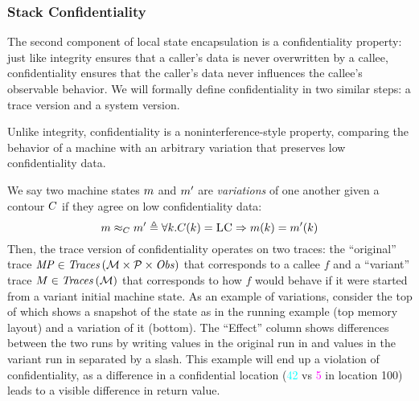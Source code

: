 \documentclass[acmsmall,review,anonymous]{acmart}\settopmatter{printfolios=true,printccs=false,printacmref=false}
\begin{document}
{%
%

\subsubsection{Stack Confidentiality}

The second component of local state encapsulation is a confidentiality
property: just like integrity ensures that a caller's data is never
overwritten by a callee, confidentiality ensures that the caller's data never
influences the callee's observable behavior. We will formally define
confidentiality in two similar steps: a trace version and a system
version.

Unlike integrity, confidentiality is a noninterference-style property,
comparing the behavior of a machine with an arbitrary variation that
preserves low confidentiality data.

We say two machine states \(m\) and \(m'\) are {\em variations}
of one another given a contour \(C\) if they agree on low
confidentiality data:
%
\[
m \approx_C m' \triangleq \forall k .
C(k) = \textsc{LC} \Rightarrow m(k) =
m'(k)
\]
%
Then, the trace version of confidentiality operates on two traces: the
``original'' trace $\mathit{MP} \in \mathit{Traces}\,({\mathcal M} \times \mathcal{P} \times \mathit{Obs})$ that corresponds to a callee $f$
and a ``variant'' trace $M \in \mathit{Traces}\,({\mathcal M})$ that corresponds to how $f$
would behave if it were started from a variant initial machine state.
%
As an example of variations, consider the top of 
which shows a snapshot of the state as in the running example (top
memory layout) and a variation of it (bottom).
%
The ``Effect'' column shows differences between the two runs by writing values
in the original run in {\high} and values in the variant run in {\varied}
separated by a slash.
%
This example will end up a violation of confidentiality, as a
difference in a confidential location (\textcolor{cyan}{42} vs
\textcolor{magenta}{5} in location 100) leads to a visible
difference in return value.

}
\end{document}
